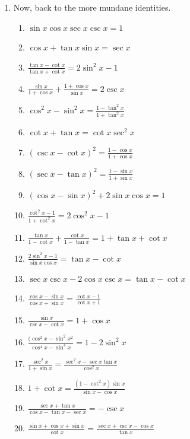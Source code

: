 \documentclass[english]{book}
\begin{document}
\begin{enumerate}
  \item Now, back to the more mundane identities. \begin{enumerate}  %
    \item $\sin x \cos x \sec x \csc x = 1$
    \item $\cos x + \tan x \sin x = \sec x $
    \item $\frac{\tan x - \cot x}{\tan x + \cot x} = 2 \sin^{2} x - 1$
    \item $\frac{\sin x}{1 + \cos x} + \frac{1 + \cos x}{\sin x} = 2 \csc x$
    \item $\cos^{2} x - \sin^{2} x = \frac{ 1 - \tan^{2} x }{ 1 + \tan^{2} x }$
    \item $\cot x + \tan x = \cot x \sec^{2} x$
    \item $(\csc x - \cot x)^2 = \frac{1 - \cos x}{1 + \cos x}$
    \item $(\sec x - \tan x)^2 = \frac{1 - \sin x}{1 + \sin x}$
    \item $(\cos x - \sin x)^2 + 2  \sin x \cos x = 1$
    \item $\frac{ \cot^{2} x - 1}{1 + \cot^{2} x} = 2 \cos^{2} x - 1$
    \item $\frac{\tan x}{1 - \cot x} + \frac{\cot x}{1 - \tan x} = 1 + \tan x + \cot x$
    \item $\frac{2 \sin^{2} x - 1}{\sin x \cos x} = \tan x - \cot x$
    \item $\sec x \csc x - 2  \cos x \csc x = \tan x - \cot x$
    \item $\frac{\cos x - \sin x}{\cos x + \sin x} = \frac{\cot x - 1}{\cot x  + 1}$
    \item $\frac{\sin x}{\csc x - \cot x} = 1 + \cos x$
    \item $\frac{ (\cos^{2} x - \sin^{2} x{^2} }{ \cos^{4} x - \sin^{4} x } =1-2 \sin^{2} x$
    \item $\frac{\sec^{2} x}{1 + \sin x} = \frac{ \sec^{2} x - \sec x \tan x }{\cos^{2} x}$
    \item $1 + \cot x = \frac{(1 - \cot^{2} x) \sin x}{\sin x - \cos x}$
    \item $\frac{\sec x + \tan x}{\cos x - \tan x - \sec x} = - \csc x$
    \item $\frac{\sin x + \cos x + \sin x}{\cot x} =\frac{\sec x + \csc x - \cos x}{\tan x}$
  \end{enumerate}


\end{enumerate}
\end{document}
